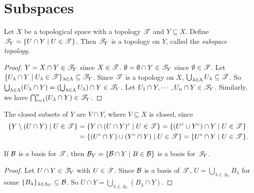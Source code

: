 \section*{Subspaces}

\begin{proposition}
    Let $X$ be a topological space with a topology $\mathscr{T}$ and $Y \subseteq X$. Define $\mathscr{T}_Y = \{U \cap Y \mid U \in \mathscr{T}\}$. Then $\mathscr{T}_Y$ is a topology on $Y$, called the \emph{subspace topology}.
\end{proposition}

\begin{proof}
    $Y = X \cap Y \in \mathscr{T}_Y$ since $X \in \mathscr{T}$. $\emptyset = \emptyset \cap Y  \in \mathscr{T}_Y$ since $\emptyset \in \mathscr{T}$. Let $\{U_\lambda \cap Y \mid U_\lambda \in \mathscr{T}\}_{\lambda \in \Lambda} \subseteq \mathscr{T}_Y$. Since $\mathscr{T}$ is a topology on $X$, $\bigcup_{\lambda \in \Lambda} U_\lambda \subseteq \mathscr{T}$. So $\bigcup_{\lambda \in \Lambda} (U_\lambda \cap Y) = (\bigcup_{\lambda \in \Lambda}U_\lambda) \cap Y \in \mathscr{T}_Y$. Let $U_1 \cap Y,\cdots,U_n \cap Y \in \mathscr{T}_Y$. Similarly, we have $\bigcap_{i=1}^n (U_\lambda \cap Y) \in \mathscr{T}_Y$. 
\end{proof}

\begin{remark}
    The closed subsets of $Y$ are $V \cap Y$, where $V \subseteq X$ is closed, since 
    \begin{align*}
        \{Y \setminus (U \cap Y) \mid U \in \mathscr{T}\} &= \{Y \cap (U \cap Y)^c \mid U \in \mathscr{T}\} = \{(U^c \cup Y^c) \cap Y \mid U \in \mathscr{T}\} \\
                                                   &= \{(U^c \cap Y) \cup (Y^c \cap Y) \mid U \in \mathscr{T}\} = \{U^c \cap Y \mid U \in \mathscr{T}\}.
    \end{align*}
\end{remark}

\begin{proposition}
    If $\mathcal{B}$ is a basis for $\mathscr{T}$, then $\mathcal{B}_Y = \{\mathcal{B} \cap Y \mid B \in \mathcal{B}\}$ is a basis for $\mathscr{T}_Y$.
\end{proposition}

\begin{proof}
    Let $U \cap Y \in \mathscr{T}_Y$ with $U \in \mathscr{T}$. Since $\mathcal{B}$ is a basis of $\mathscr{T}$, $U = \bigcup_{\lambda \in \Lambda_U} B_\lambda$ for some $\{B_\lambda\}_{\lambda \in \Lambda_U} \subseteq \mathcal{B}$. So $U \cap Y = \bigcup_{\lambda \in \Lambda_U} (B_\lambda \cap Y)$. 
\end{proof}

